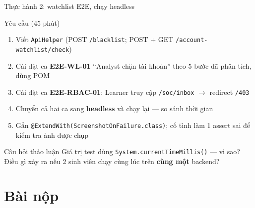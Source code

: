 \documentclass[aspectratio=169,12pt]{beamer}
\begin{document}
\begin{frame}{Thực hành 2: watchlist E2E, chạy headless}
  \vspace*{-0.3em}
  \begin{exampleblock}{Yêu cầu (45 phút)}
    \begin{enumerate}
      \item Viết \texttt{ApiHelper} (POST \texttt{/blacklist};
            POST + GET \texttt{/account-watchlist/check})
      \item Cài đặt ca \textbf{E2E-WL-01} ``Analyst chặn tài khoản''
            theo 5 bước đã phân tích, dùng POM
      \item Cài đặt ca \textbf{E2E-RBAC-01}: Learner truy cập
            \texttt{/soc/inbox} $\to$ redirect \texttt{/403}
      \item Chuyển cả hai ca sang \textbf{headless} và chạy lại ---
            so sánh thời gian
      \item Gắn \texttt{@ExtendWith(ScreenshotOnFailure.class)};
            cố tình làm 1 assert sai để kiểm tra ảnh được chụp
    \end{enumerate}
  \end{exampleblock}

  \begin{alertblock}{Câu hỏi thảo luận}
    Giá trị test dùng \texttt{System.currentTimeMillis()} --- vì sao?
    Điều gì xảy ra nếu 2 sinh viên chạy cùng lúc trên \textbf{cùng một}
    backend?
  \end{alertblock}
\end{frame}

\section{Bài nộp}
\end{document}
